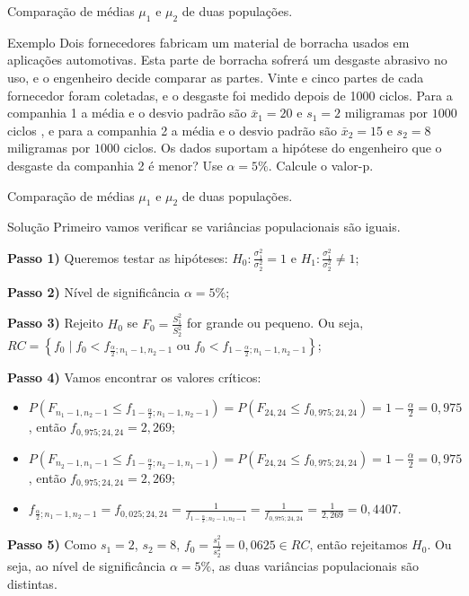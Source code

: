 \documentclass[9pt]{beamer}
\begin{document}
\begin{frame}{Comparação de médias $\mu_1$ e $\mu_2$ de duas populações.}

\begin{block}{Exemplo}
	Dois fornecedores fabricam um material de borracha usados em aplicações automotivas. Esta parte de borracha sofrerá um desgaste abrasivo no uso, e o engenheiro decide comparar as partes. Vinte e cinco partes de cada fornecedor foram coletadas, e o desgaste foi medido depois de 1000 ciclos. Para a companhia 1 a média e o desvio padrão são $\bar{x}_1 = 20$ e $s_1 = 2$ miligramas  por $1000$ ciclos , e para a companhia 2 a média e o desvio padrão são $\bar{x}_2=15$ e $s_2=8$ miligramas por $1000$ ciclos. Os dados suportam a hipótese do engenheiro que o desgaste da companhia 2 é menor? Use $\alpha=5\%$. Calcule o valor-p.
\end{block}
 
\end{frame}

\begin{frame}{Comparação de médias $\mu_1$ e $\mu_2$ de duas populações.}

\begin{block}{Solução}
	Primeiro vamos verificar se variâncias populacionais são iguais.
	
	\textbf{Passo 1)} Queremos testar as hipóteses: $H_0: \frac{\sigma_1^2}{\sigma_2^2} = 1$ e $H_1:\frac{\sigma_1^2}{\sigma_2^2} \neq 1$;
	
	\textbf{Passo 2)} Nível de significância $\alpha=5\%$;
	
	\textbf{Passo 3)} Rejeito $H_0$ se $F_0 = \frac{S_1^2}{S_2^2}$ for grande ou pequeno. Ou seja, $RC= \left\{ f_0 \mid f_0 < f_{\frac{\alpha}{2}; n_1-1, n_2-1} \mbox{ ou } f_0 < f_{1-\frac{\alpha}{2};n_1-1, n_2-1} \right\}$;
	
	\textbf{Passo 4)} Vamos encontrar os valores críticos:
	\begin{itemize}
		\item $P(F_{n_1-1, n_2-1} \leq f_{1-\frac{\alpha}{2}; n_1-1, n_2-1}) = P(F_{24, 24} \leq f_{0,975; 24, 24}) = 1-\frac{\alpha}{2} = 0,975$, então $f_{0,975; 24, 24} = 2,269$;
		\item $P(F_{n_2-1, n_1-1} \leq f_{1-\frac{\alpha}{2}; n_2-1, n_1-1}) = P(F_{24, 24} \leq f_{0,975; 24, 24}) = 1-\frac{\alpha}{2} = 0,975$, então $f_{0,975; 24, 24} = 2,269$;
		\item $f_{\frac{\alpha}{2};n_1-1, n_2-1} = f_{0,025; 24, 24} = \frac{1}{f_{1-\frac{\alpha}{2}; n_2-1, n_2-1}} = \frac{1}{f_{0,975; 24, 24}} = \frac{1}{2,269} =0,4407$.
	\end{itemize}
	
	\textbf{Passo 5)} Como $s_1=2$, $s_2 = 8$, $f_0 = \frac{s_1^2}{s_2^2} = 0,0625 \in RC$, então rejeitamos $H_0$. Ou seja, ao nível de significância $\alpha=5\%$, as duas variâncias populacionais são distintas.
\end{block}
\end{frame}
\end{document}

